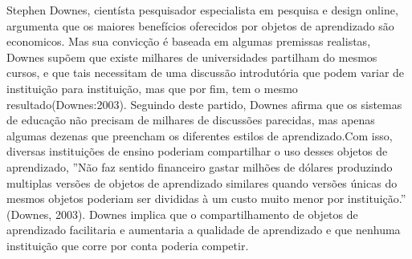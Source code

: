 \documentclass[12pt,openright,oneside,a4paper,english,french,spanish,brazil]{unifil}
\begin{document}
Stephen Downes, cientísta pesquisador especialista em pesquisa e design online, argumenta que os maiores benefícios oferecidos por objetos de aprendizado são economicos. Mas sua convicção é baseada em algumas premissas realistas, Downes supõem que existe milhares de universidades partilham do mesmos cursos, e que tais necessitam de uma discussão introdutória que podem variar de instituição para instituição, mas que por fim, tem o mesmo resultado(Downes:2003). Seguindo deste partido, Downes afirma que os sistemas de educação não precisam de milhares de discussões parecidas, mas apenas algumas dezenas que preencham os diferentes estilos de aprendizado.Com isso, diversas instituições de ensino poderiam compartilhar o uso desses objetos de aprendizado, ''Não faz sentido financeiro gastar milhões de dólares produzindo multiplas versões de objetos de aprendizado similares quando versões únicas do mesmos objetos poderiam ser divididas à um custo muito menor por instituição.'' (Downes, 2003). Downes implica que o compartilhamento de objetos de aprendizado facilitaria e aumentaria a qualidade de aprendizado e que nenhuma instituição que corre por conta poderia competir.
\end{document}

